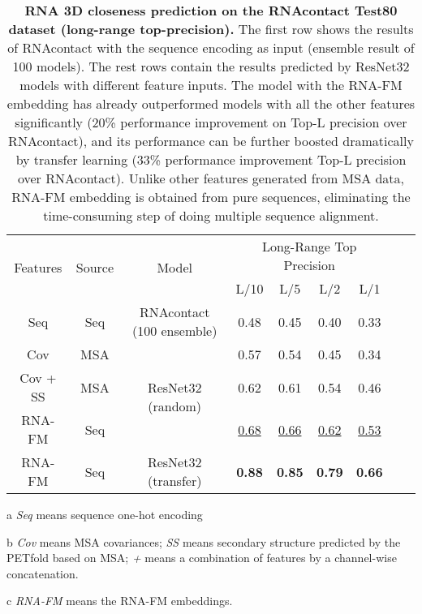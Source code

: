 \begin{table}
\centering
\caption{\textbf{RNA 3D closeness prediction on the RNAcontact Test80 dataset (long-range top-precision).} The first row shows the results of RNAcontact with the sequence encoding as input (ensemble result of 100 models). The rest rows contain the results predicted by ResNet32 models with different feature inputs. The model with the RNA-FM embedding has already outperformed models with all the other features significantly (20\% performance improvement on Top-L precision over RNAcontact), and its performance can be further boosted dramatically by transfer learning (33\% performance improvement Top-L precision over RNAcontact). Unlike other features generated from MSA data, RNA-FM embedding is obtained from pure sequences, eliminating the time-consuming step of doing multiple sequence alignment.}
\label{Tab.rnacontact}
\begin{threeparttable}
\begin{tabular}{ccccccccc} 
\toprule
\multirow{2}{*}{Features} & \multirow{2}{*}{Source} & \multirow{2}{*}{Model} &
\multicolumn{4}{c}{Long-Range Top Precision}  \\ 
\cmidrule(lr){4-7}
&       &       & L/10 & L/5  & L/2  & L/1    \\ 
\midrule
Seq\tnote{a}     & Seq   & RNAcontact (100 ensemble)   & 0.48 & 0.45 & 0.40 & 0.33   \\
\midrule
Cov      & MSA   & \multirow{3}{*}{ResNet32 (random)}  & 0.57 & 0.54 & 0.45 & 0.34   \\
Cov + SS\tnote{b}   & MSA   &  & 0.62 & 0.61 & 0.54 & 0.46   \\
RNA-FM\tnote{c} & Seq   &    & \underline{0.68} & \underline{0.66} & \underline{0.62} & \underline{0.53}   \\
\midrule
RNA-FM & Seq    & ResNet32 (transfer)    & \textbf{0.88} & \textbf{0.85} & \textbf{0.79} & \textbf{0.66}   \\
\bottomrule

\end{tabular}
\begin{tablenotes}
        \footnotesize
        \item[a] \textit{Seq} means sequence one-hot encoding
        \item[b] \textit{Cov} means MSA covariances; \textit{SS} means secondary structure predicted by the PETfold based on MSA; \textit{+} means a combination of features by a channel-wise concatenation.
        \item[c]  \textit{RNA-FM} means the RNA-FM embeddings. 
      \end{tablenotes}
\end{threeparttable}

\end{table}




